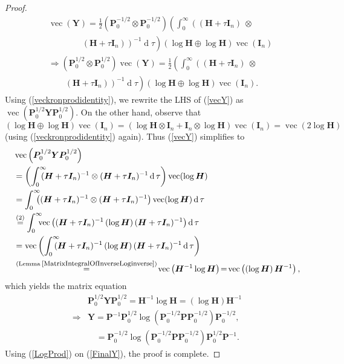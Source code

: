 \documentclass[letterpaper,10pt,twocolumn,conference]{ieeeconf}
\newcommand{\bbP}{{\bm{P}}}
\newcommand{\bbI}{\bm{I}}
\newcommand{\bbH}{\bm{H}}
\newcommand{\bbY}{\bm{Y}}
\newcommand{\differential}{\operatorname{d}}
\renewcommand{\vec}{\operatorname{vec}}
\begin{document}
\begin{proof}
\begin{align}
&\vec(\bbY) = \frac{1}{2}\left(\bbP_{0}^{-1/2} \otimes \bbP_{0}^{-1/2}\right) \left(\displaystyle\int_{0}^{\infty}\!\!\left((\bbH + \tau\bbI_{n}) \:\otimes\: \right.\right. \nonumber\\
&\qquad\qquad\left.\left.(\bbH + \tau\bbI_{n})\right)^{-1}\differential\tau\right)\left(\log\bbH \oplus \log\bbH\right)\vec(\bbI_{n}) \nonumber\\
&\Rightarrow \left(\bbP_{0}^{1/2} \otimes \bbP_{0}^{1/2}\right)\vec(\bbY) = \frac{1}{2}\left(\displaystyle\int_{0}^{\infty}\!\!\left((\bbH + \tau\bbI_{n}) \:\otimes\: \right.\right. \nonumber\\
&\qquad\left.\left.(\bbH + \tau\bbI_{n})\right)^{-1}\differential\tau\right)\left(\log\bbH \oplus \log\bbH\right)\vec(\bbI_{n}).
\label{vecY}	
\end{align}
Using (\ref{veckronprodidentity}), we rewrite the LHS of (\ref{vecY}) as $\vec\left(\bbP_{0}^{1/2}\bbY\bbP_{0}^{1/2}\right)$. On the other hand, observe that $\left(\log\bbH \oplus \log\bbH\right)\allowbreak\vec(\bbI_{n}) = \left(\log\bbH\allowbreak\otimes\bbI_{n} \allowbreak + \bbI_{n}\otimes\log\bbH\right)\vec(\bbI_{n})=\vec\left(2\log\bbH\right)$ (using (\ref{veckronprodidentity}) again). Thus (\ref{vecY}) simplifies to 
\begin{align}
&\vec\left(\bbP_{0}^{1/2}\bbY\bbP_{0}^{1/2}\right) \nonumber\\
&= \left(\displaystyle\int_{0}^{\infty}\!\!\!\!(\bbH + \tau\bbI_{n})^{-1}\otimes(\bbH + \tau\bbI_{n})^{-1}\differential\tau\right)\vec(\log\bbH) \label{vecYFirstStep}\\
&=  \displaystyle\int_{0}^{\infty}\!\!\!\!\left((\bbH + \tau\bbI_{n})^{-1}\otimes(\bbH + \tau\bbI_{n})^{-1}\right) \vec(\log\bbH)\differential\tau \nonumber\\
&\stackrel{\small{(2)}}{=} \displaystyle\int_{0}^{\infty}\!\!\!\!\vec\left((\bbH + \tau\bbI_{n})^{-1}\left(\log\bbH\right)(\bbH + \tau\bbI_{n})^{-1}\right)\differential\tau \nonumber\\
&= \vec\left(\displaystyle\int_{0}^{\infty}\!\!\!\!(\bbH + \tau\bbI_{n})^{-1}\left(\log\bbH\right)(\bbH + \tau\bbI_{n})^{-1}\differential\tau\right)\nonumber\\
&\stackrel{{\footnotesize{(\text{Lemma} \:\ref{MatrixIntegralOfInverseLoginverse})}}}{=} \!\vec\left(\bbH^{-1}\log\bbH\right)\! = \!\vec\left(\left(\log\bbH\right)\bbH^{-1}\right),
\label{Simplified}	
\end{align}
which yields the matrix equation 
\begin{align}
&\bbP_{0}^{1/2}\bbY\bbP_{0}^{1/2} = \bbH^{-1}\log\bbH = \left(\log\bbH\right)\bbH^{-1}\nonumber\\
\Rightarrow &\bbY = \bbP^{-1}\bbP_{0}^{1/2}\log\left(\bbP_{0}^{-1/2}\bbP\bbP_{0}^{-1/2}\right)\bbP_{0}^{-1/2}, \nonumber\\
&\quad = \bbP_{0}^{-1/2}\log\left(\bbP_{0}^{-1/2}\bbP\bbP_{0}^{-1/2}\right)\bbP_{0}^{1/2}\bbP^{-1}.
\label{FinalY}
\end{align}
Using (\ref{LogProd}) on (\ref{FinalY}), the proof is complete.
\end{proof}
\end{document}
